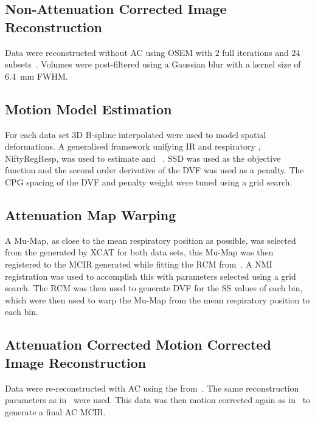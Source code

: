     \subsection{Non-Attenuation Corrected Image Reconstruction} \label{sec:non-attenuation_corrected_image_reconstruction}
        Data were reconstructed without \gls{AC} using \gls{OSEM} with $2$ full iterations and $24$ subsets~\cite{Hudson1994}. Volumes were post-filtered using a Gaussian blur with a kernel size of \SI{6.4}{\milli\metre} \gls{FWHM}.
    
    \subsection{Motion Model Estimation} \label{sec:motion_model_estimation}
        For each data set \gls{3D} B-spline interpolated  were used to model spatial deformations. A generalised framework unifying \gls{IR} and respiratory , NiftyRegResp, was used to estimate  and ~\cite{McClelland2017}. \gls{SSD} was used as the objective function and the second order derivative of the \gls{DVF} was used as a penalty. The \gls{CPG} spacing of the \gls{DVF} and penalty weight were tuned using a grid search.
    
    \subsection{Attenuation Map Warping} \label{sec:attenuation_map_warping}
        A \gls{Mu-Map}, as close to the mean respiratory position as possible, was selected from the  generated by \gls{XCAT} for both data sets, this \gls{Mu-Map} was then registered to the \gls{MCIR} generated while fitting the \gls{RCM} from~. A \gls{NMI} registration was used to accomplish this with parameters selected using a grid search. The \gls{RCM} was then used to generate \gls{DVF} for the \gls{SS} values of each bin, which were then used to warp the \gls{Mu-Map} from the mean respiratory position to each bin.
        
    \subsection{Attenuation Corrected Motion Corrected Image Reconstruction} \label{sec:attenuation_corrected_image_reconstruction}
        Data were re-reconstructed with \gls{AC} using the  from~. The same reconstruction parameters as in~ were used. This data was then motion corrected again as in~ to generate a final \gls{AC} \gls{MCIR}.
    
